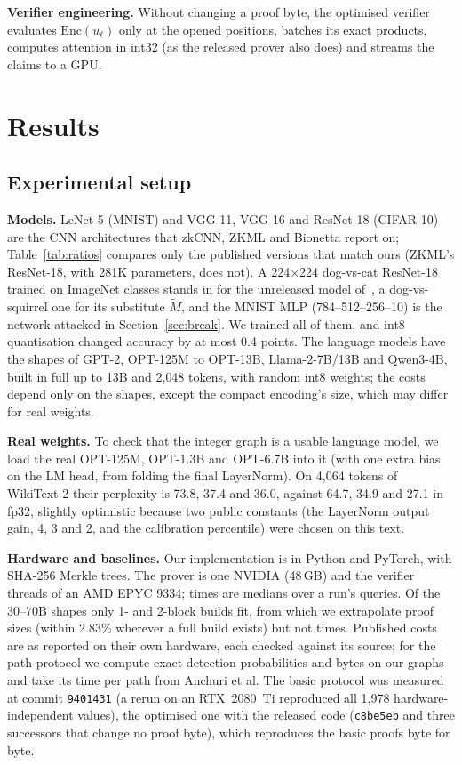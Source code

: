 \documentclass[sigconf,nonacm]{acmart}
\newcommand{\enc}{\mathrm{Enc}}
\newcommand{\para}[1]{\par\noindent\textbf{#1}\quad}
\begin{document}
\para{Verifier engineering.} Without changing a proof byte, the optimised verifier evaluates
$\enc(u_\ell)$ only at the opened positions, batches its exact products, computes attention in
int32 (as the released prover also does) and streams the claims to a GPU.

\section{Results}
\label{sec:results}

\subsection{Experimental setup}
\label{sec:setup}
\para{Models.} LeNet-5 (MNIST) and VGG-11, VGG-16 and ResNet-18 (CIFAR-10) are the CNN
architectures that zkCNN, ZKML and Bionetta report on; Table~\ref{tab:ratios} compares only the
published versions that match ours (ZKML's ResNet-18, with 281K parameters, does not). A
224$\times$224 dog-vs-cat ResNet-18 trained on ImageNet classes stands in for the unreleased model
of~\cite{anchuri2026verifiable}, a dog-vs-squirrel one for its substitute $\tilde M$, and the
MNIST MLP (784--512--256--10) is the network attacked in Section~\ref{sec:break}. We trained all of
them, and int8 quantisation changed accuracy by at most 0.4 points. The language models have the
shapes of GPT-2, OPT-125M to OPT-13B, Llama-2-7B/13B and Qwen3-4B, built in full up to 13B and
2{,}048 tokens, with random int8 weights; the costs depend only on the shapes, except the
compact encoding's size, which may differ for real weights.

\para{Real weights.} To check that the integer graph is a usable language model, we load the real
OPT-125M, OPT-1.3B and OPT-6.7B into it (with one extra bias on the LM head, from folding the final
LayerNorm). On 4{,}064 tokens of WikiText-2 their perplexity is 73.8, 37.4 and 36.0, against 64.7,
34.9 and 27.1 in fp32, slightly optimistic because two public constants (the LayerNorm output gain, 4, 3 and 2, and the calibration percentile) were chosen on this text.

\para{Hardware and baselines.} Our implementation is in Python and PyTorch, with SHA-256 Merkle trees. The prover is one NVIDIA \ProverGPU{} (48\,GB) and the verifier
\VerifierThreads{} threads of an AMD EPYC 9334; times are medians over a run's queries. Of the
30--70B shapes only 1- and 2-block builds fit, from which we extrapolate proof sizes (within
2.83\% wherever a full build exists) but not times. Published costs are as reported on their own
hardware, each checked against its source; for the path protocol we compute exact detection
probabilities and bytes on our graphs and take its time per path from Anchuri et al. The basic
protocol was measured at commit \texttt{9401431} (a rerun on an RTX~2080~Ti reproduced all
1{,}978 hardware-independent values), the optimised one with the released code (\texttt{c8be5eb}
and three successors that change no proof byte), which reproduces the basic proofs byte for byte.
\end{document}
